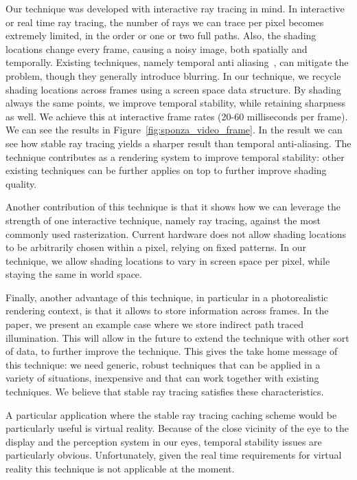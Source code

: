 Our technique was developed with interactive ray tracing in mind. In interactive or real time ray tracing, the number of rays we can trace per pixel becomes extremely limited, in the order or one or two full paths. Also, the shading locations change every frame, causing a noisy image, both spatially and temporally. Existing techniques, namely temporal anti aliasing~\cite{Karis2014}, can mitigate the problem, though they generally introduce blurring. In our technique, we recycle shading locations across frames using a screen space data structure. By shading always the same points, we improve temporal stability, while retaining sharpness as well. We achieve this at interactive frame rates (20-60 milliseconds per frame). We can see the results in Figure~\ref{fig:sponza_video_frame}. In the result we can see how stable ray tracing yields a sharper result than temporal anti-aliasing. The technique contributes as a rendering system to improve temporal stability: other existing techniques can be further applies on top to further improve shading quality. 

Another contribution of this technique is that it shows how we can leverage the strength of one interactive technique, namely ray tracing, against the most commonly used rasterization. Current hardware does not allow shading locations to be arbitrarily chosen within a pixel, relying on fixed patterns. In our technique, we allow shading locations to vary in screen space per pixel, while staying the same in world space. 

Finally, another advantage of this technique, in particular in a photorealistic rendering context, is that it allows to store information across frames. In the paper, we present an example case where we store indirect path traced illumination. This will allow in the future to extend the technique with other sort of data, to further improve the technique. This gives the take home message of this technique: we need generic, robust techniques that can be applied in a variety of situations, inexpensive and that can work together with existing techniques. We believe that stable ray tracing satisfies these characteristics. 

A particular application where the stable ray tracing caching scheme would be particularly useful is virtual reality. Because of the close vicinity of the eye to the display and the perception system in our eyes, temporal stability issues are particularly obvious. Unfortunately, given the real time requirements for virtual reality this technique is not applicable at the moment.


